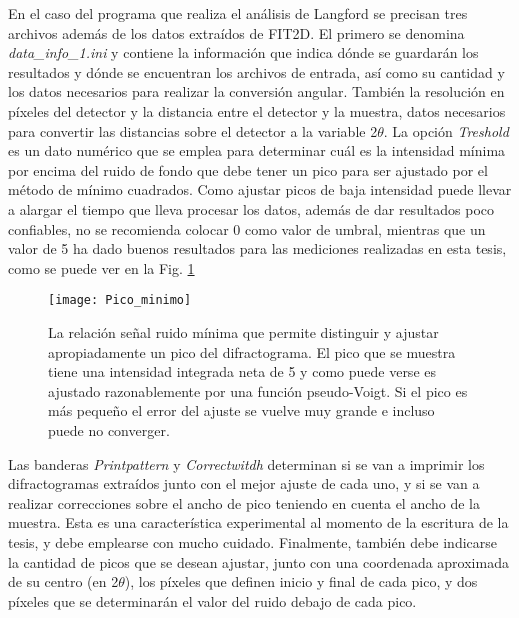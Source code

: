 En el caso del programa que realiza el análisis de Langford se precisan tres archivos además de los datos extraídos de FIT2D.
El primero se denomina \textit{data\_info\_1.ini} y contiene la información que indica dónde se guardarán los resultados y dónde se encuentran los archivos de entrada, así como su cantidad y los datos necesarios para realizar la conversión angular.
También la resolución en píxeles del detector y la distancia entre el detector y la muestra, datos necesarios para convertir las distancias sobre el detector a la variable 2$\theta$.
La opción \textit{Treshold} es un dato numérico que se emplea para determinar cuál es la intensidad mínima por encima del ruido de fondo que debe tener un pico para ser ajustado por el método de mínimo cuadrados. 
Como ajustar picos de baja intensidad puede llevar a alargar el tiempo que lleva procesar los datos, además de dar resultados poco confiables, no se recomienda colocar 0 como valor de umbral, mientras que un valor de 5 ha dado buenos resultados para las mediciones realizadas en esta tesis, como se puede ver en la Fig. \ref{fig:MinIntensity}

\begin{figure}[!htb]
  \centering
  \texttt{[image: Pico\_minimo]}
  \caption{La relación señal ruido mínima que permite distinguir y ajustar apropiadamente un pico del difractograma. El pico que se muestra tiene una intensidad integrada neta de 5 y como puede verse es ajustado razonablemente por una función pseudo-Voigt. Si el pico es más pequeño el error del ajuste se vuelve muy grande e incluso puede no converger.}
  \label{fig:MinIntensity}
\end{figure}

Las banderas \textit{Printpattern} y \textit{Correctwitdh} determinan si se van a imprimir los difractogramas extraídos junto con el mejor ajuste de cada uno, y si se van a realizar correcciones sobre el ancho de pico teniendo en cuenta el ancho de la muestra.
Esta es una característica experimental al momento de la escritura de la tesis, y debe emplearse con mucho cuidado.
Finalmente, también debe indicarse la cantidad de picos que se desean ajustar, junto con una coordenada aproximada de su centro (en 2$\theta$), los píxeles que definen inicio y final de cada pico, y dos píxeles que se determinarán el valor del ruido debajo de cada pico.


